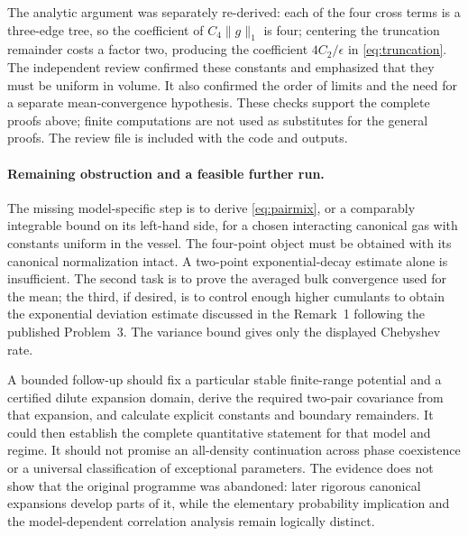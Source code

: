 The analytic argument was separately re-derived: each of the four cross terms is a three-edge tree, so the coefficient of \(C_4\|g\|_1\) is four; centering the truncation remainder costs a factor two, producing the coefficient \(4C_2/\epsilon\) in \eqref{eq:truncation}. The independent review confirmed these constants and emphasized that they must be uniform in volume. It also confirmed the order of limits and the need for a separate mean-convergence hypothesis. These checks support the complete proofs above; finite computations are not used as substitutes for the general proofs. The review file is included with the code and outputs.

\paragraph{Remaining obstruction and a feasible further run.}
The missing model-specific step is to derive \eqref{eq:pairmix}, or a comparably integrable bound on its left-hand side, for a chosen interacting canonical gas with constants uniform in the vessel. The four-point object must be obtained with its canonical normalization intact. A two-point exponential-decay estimate alone is insufficient. The second task is to prove the averaged bulk convergence used for the mean; the third, if desired, is to control enough higher cumulants to obtain the exponential deviation estimate discussed in the Remark~1 following the published Problem~3. The variance bound gives only the displayed Chebyshev rate.

A bounded follow-up should fix a particular stable finite-range potential and a certified dilute expansion domain, derive the required two-pair covariance from that expansion, and calculate explicit constants and boundary remainders. It could then establish the complete quantitative statement for that model and regime. It should not promise an all-density continuation across phase coexistence or a universal classification of exceptional parameters. The evidence does not show that the original programme was abandoned: later rigorous canonical expansions develop parts of it, while the elementary probability implication and the model-dependent correlation analysis remain logically distinct.
